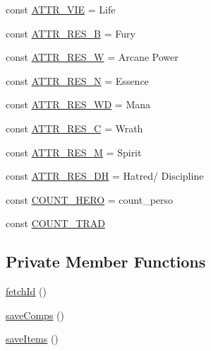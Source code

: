\begin{DoxyCompactItemize}
\item 
const \hyperlink{class_hero_ac12926c2f7d9d0ad91ee3956de0e4471}{A\+T\+T\+R\+\_\+\+V\+IE} = \textquotesingle{}Life\textquotesingle{}
\item 
const \hyperlink{class_hero_addcab5a72ace74f096d4b39954b333b8}{A\+T\+T\+R\+\_\+\+R\+E\+S\+\_\+B} = \textquotesingle{}Fury\textquotesingle{}
\item 
const \hyperlink{class_hero_af35909ae1a67c5d407c20569ad1847ce}{A\+T\+T\+R\+\_\+\+R\+E\+S\+\_\+W} = \textquotesingle{}Arcane Power\textquotesingle{}
\item 
const \hyperlink{class_hero_ac3604cbb4819eaacac74d3c835891f5a}{A\+T\+T\+R\+\_\+\+R\+E\+S\+\_\+N} = \textquotesingle{}Essence\textquotesingle{}
\item 
const \hyperlink{class_hero_a9ece8f2977e76399a6a9845fedbd3223}{A\+T\+T\+R\+\_\+\+R\+E\+S\+\_\+\+WD} = \textquotesingle{}Mana\textquotesingle{}
\item 
const \hyperlink{class_hero_ada567313568e233b5ff2edef1a5863cc}{A\+T\+T\+R\+\_\+\+R\+E\+S\+\_\+C} = \textquotesingle{}Wrath\textquotesingle{}
\item 
const \hyperlink{class_hero_a4cde8370325235ef3e404a0b8c5d9699}{A\+T\+T\+R\+\_\+\+R\+E\+S\+\_\+M} = \textquotesingle{}Spirit\textquotesingle{}
\item 
const \hyperlink{class_hero_ad2a0257ef2100e0c6695b71ebd63baad}{A\+T\+T\+R\+\_\+\+R\+E\+S\+\_\+\+DH} = \textquotesingle{}Hatred/ Discipline\textquotesingle{}
\item 
const \hyperlink{class_hero_afb8b78e6bf7572082037da56ff7b00b5}{C\+O\+U\+N\+T\+\_\+\+H\+E\+RO} = \textquotesingle{}count\+\_\+perso\textquotesingle{}
\item 
const \hyperlink{class_hero_ad67b10f066bfcae5b86bed2a5410f9f6}{C\+O\+U\+N\+T\+\_\+\+T\+R\+AD}
\end{DoxyCompactItemize}
\subsection*{Private Member Functions}
\begin{DoxyCompactItemize}
\item 
\hyperlink{class_hero_a5aa91e7ea559a59c8151845a855fd546}{fetch\+Id} ()
\item 
\hyperlink{class_hero_a723f83bed9d55248a97b392739402d3a}{save\+Comps} ()
\item 
\hyperlink{class_hero_a4e38d5d658b70461a8380aeb69fdc9d5}{save\+Items} ()
\end{DoxyCompactItemize}
